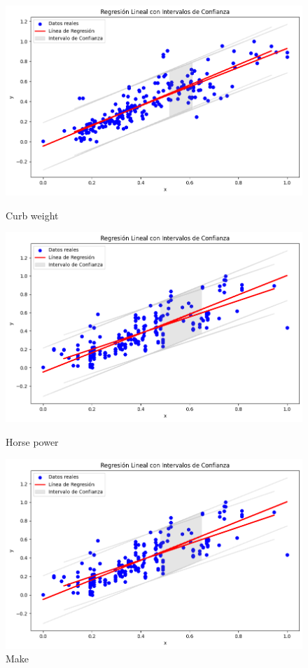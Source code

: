 \documentclass{article}
\begin{document}
\begin{figure}[H]
    \vspace{0.5cm} 

    \begin{minipage}[b]{0.3\textwidth}
        \centering
        \includegraphics[width=\textwidth]{image4.png}
        \caption*{Curb weight}
    \end{minipage}
    \begin{minipage}[b]{0.3\textwidth}
        \centering
        \includegraphics[width=\textwidth]{image5.png}
        \caption*{Horse power}
    \end{minipage}
    \begin{minipage}[b]{0.3\textwidth}
        \centering
        \includegraphics[width=\textwidth]{image6.png}
        \caption*{Make}
    \end{minipage}
\end{figure}
\end{document}
